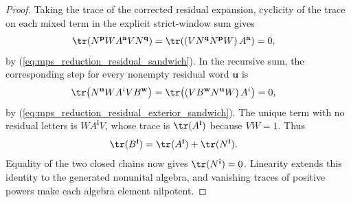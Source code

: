 \begin{proof}
    \leanok
    Taking the trace of the corrected residual expansion, cyclicity of the
    trace on each mixed term in the explicit strict-window sum gives
    \begin{align}
        \tr\!\left(
        N^{\mathbf p}WA^{\mathbf a}VN^{\mathbf q}\right)
         & =\tr\!\left(
        \left(VN^{\mathbf q}N^{\mathbf p}W\right)A^{\mathbf a}\right)
        =0,
        \notag
    \end{align}
    by (\ref{eq:mps_reduction_residual_sandwich}).  In the recursive sum, the
    corresponding step for every nonempty residual word $\mathbf u$ is
    \begin{align}
        \tr\!\left(N^{\mathbf u}WA^iVB^{\mathbf w}\right)
         & =\tr\!\left(
        \left(VB^{\mathbf w}N^{\mathbf u}W\right)A^i\right)
        =0,
        \notag
    \end{align}
    by (\ref{eq:mps_reduction_residual_exterior_sandwich}).  The unique term
    with no residual letters is $WA^{\mathbf i}V$, whose trace is
    $\tr(A^{\mathbf i})$ because $VW=1$.  Thus
    \begin{align}
        \tr(B^{\mathbf i})
         & =\tr(A^{\mathbf i})+\tr(N^{\mathbf i}).
        \label{eq:mps_reduction_residual_trace_decomposition}
    \end{align}
    Equality of the two closed chains now gives
    $\tr(N^{\mathbf i})=0$.  Linearity extends this identity to the generated
    nonunital algebra, and vanishing traces of positive powers make each
    algebra element nilpotent.
\end{proof}

